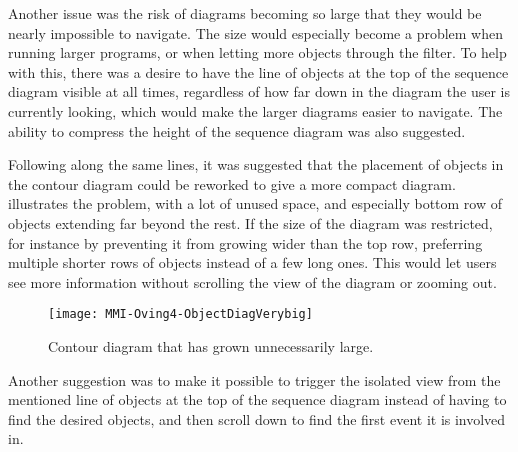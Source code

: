 Another issue was the risk of diagrams becoming so large that they would be nearly impossible to navigate.
The size would especially become a problem when running larger programs, or when letting more objects through the filter.
To help with this, there was a desire to have the line of objects at the top of the sequence diagram visible at all times, regardless of how far down in the diagram the user is currently looking, which would make the larger diagrams easier to navigate.
The ability to compress the height of the sequence diagram was also suggested.

Following along the same lines, it was suggested that the placement of objects in the contour diagram could be reworked to give a more compact diagram.
 illustrates the problem, with a lot of unused space, and especially bottom row of objects extending far beyond the rest.
If the size of the diagram was restricted, for instance by preventing it from growing wider than the top row, preferring multiple shorter rows of objects instead of a few long ones.
This would let users see more information without scrolling the view of the diagram or zooming out.

\begin{figure}[ht]
	\centering
	\texttt{[image: MMI-Oving4-ObjectDiagVerybig]}
	\caption{Contour diagram that has grown unnecessarily large.}
	\label{fig:MMI-Oving4-ObjectDiagVerybig}
\end{figure}

Another suggestion was to make it possible to trigger the isolated view from the mentioned line of objects at the top of the sequence diagram instead of having to find the desired objects, and then scroll down to find the first event it is involved in.%
